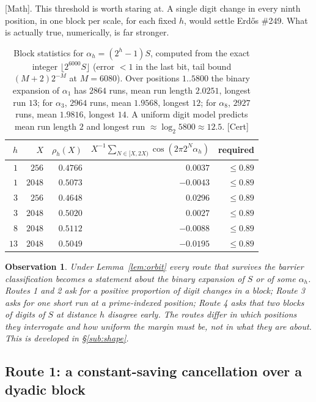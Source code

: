 \documentclass[11pt]{article}
\theoremstyle{breakplain}
\theoremstyle{breakdefinition}
\theoremstyle{breakdefinition}
\newtheorem{obs}[thm]{Observation}
\newcommand{\ev}[1]{{\small\textsf{[#1]}}\xspace}
\begin{document}
\noindent
\ev{Math}. This threshold is worth staring at. A single digit change in
every ninth position, in one block per scale, for each fixed $h$, would
settle Erd\H{o}s \#249. What is actually true, numerically, is far stronger.

\begin{table}[h]\centering
\begin{tabular}{r r r r r}
\hline
$h$ & $X$ & $\rho_h(X)$ & $X^{-1}\sum_{N\in[X,2X)}\cos(2\pi 2^N\alpha_h)$ & required \\
\hline
$1$ & $256$  & $0.4766$ & $\phantom{-}0.0037$ & $\le 0.89$ \\
$1$ & $2048$ & $0.5073$ & $-0.0043$ & $\le 0.89$ \\
$3$ & $256$  & $0.4648$ & $\phantom{-}0.0296$ & $\le 0.89$ \\
$3$ & $2048$ & $0.5020$ & $\phantom{-}0.0027$ & $\le 0.89$ \\
$8$ & $2048$ & $0.5112$ & $-0.0088$ & $\le 0.89$ \\
$13$& $2048$ & $0.5049$ & $-0.0195$ & $\le 0.89$ \\
\hline
\end{tabular}
\caption{Block statistics for $\alpha_h=(2^h-1)S$, computed from the exact
integer $\lfloor 2^{6000}S\rfloor$ (error $<1$ in the last bit, tail bound
$(M+2)2^{-M}$ at $M=6080$). Over positions $1..5800$ the binary expansion of
$\alpha_1$ has $2864$ runs, mean run length $2.0251$, longest run $13$; for
$\alpha_3$, $2964$ runs, mean $1.9568$, longest $12$; for $\alpha_8$, $2927$
runs, mean $1.9816$, longest $14$. A uniform digit model predicts mean run
length $2$ and longest run $\approx\log_2 5800\approx 12.5$. \ev{Cert}}
\label{tab:blocks}
\end{table}

\begin{obs}\label{obs:allroutes}
Under Lemma~\ref{lem:orbit} every route that survives the barrier
classification becomes a statement about the binary expansion of $S$ or of
some $\alpha_h$. Routes 1 and 2 ask for a positive proportion of digit
changes in a block; Route 3 asks for one short run at a prime-indexed
position; Route 4 asks that two blocks of digits of $S$ at distance $h$
disagree early. The routes differ in \emph{which positions} they interrogate
and \emph{how uniform} the margin must be, not in what they are about. This
is developed in \S\ref{sub:shape}.
\end{obs}

\subsection{Route 1: a constant-saving cancellation over a dyadic block}
\end{document}
